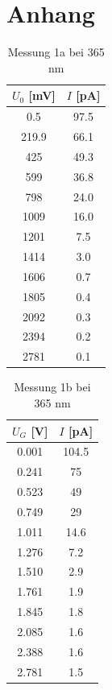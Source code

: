 \documentclass{article}
\begin{document}
\clearpage
\section{Anhang}

\begin{table}[h!]
  \centering
  \begin{tabular}{|c|c|}
      \hline
      $U_0$ [mV] & $I$ [pA] \\
      \hline
      0.5   & 97.5 \\
      219.9 & 66.1 \\
      425   & 49.3 \\
      599   & 36.8 \\
      798   & 24.0 \\
      1009  & 16.0 \\
      1201  & 7.5  \\
      1414  & 3.0  \\
      1606  & 0.7  \\
      1805  & 0.4  \\
      2092  & 0.3  \\
      2394  & 0.2  \\
      2781  & 0.1  \\
      \hline
  \end{tabular}
  \caption{Messung 1a bei 365 nm}
  \label{tab:messung1a}
\end{table}

\begin{table}[h!]
  \centering
  \begin{tabular}{|c|c|}
      \hline
      $U_G$ [V] & $I$ [pA] \\
      \hline
      0.001  & 104.5 \\
      0.241  & 75    \\
      0.523  & 49    \\
      0.749  & 29    \\
      1.011  & 14.6  \\
      1.276  & 7.2   \\
      1.510  & 2.9   \\
      1.761  & 1.9   \\
      1.845  & 1.8   \\
      2.085  & 1.6   \\
      2.388  & 1.6   \\
      2.781  & 1.5   \\
      \hline
  \end{tabular}
  \caption{Messung 1b bei 365 nm}
  \label{tab:messung1b}
\end{table}
\end{document}
